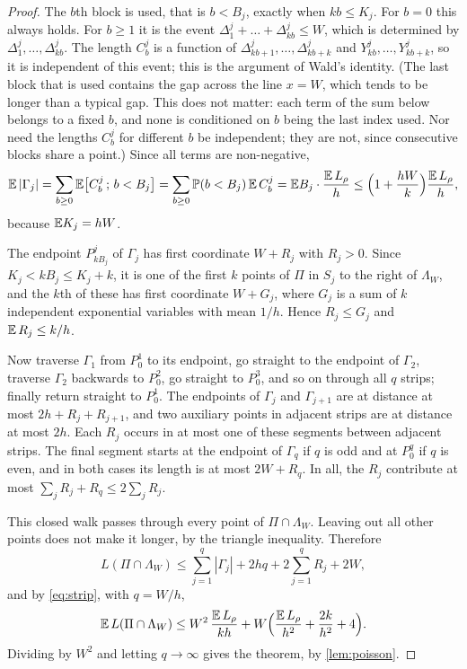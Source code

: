 \begin{proof}
The $b$th block is used, that is $b<B_j$, exactly when $kb\le K_j$. For $b=0$ this always holds. For $b\ge1$ it is the event $\Delta^j_1+\dots+\Delta^j_{kb}\le W$, which is determined by $\Delta^j_1,\dots,\Delta^j_{kb}$. The length $C^j_b$ is a function of $\Delta^j_{kb+1},\dots,\Delta^j_{kb+k}$ and $Y^j_{kb},\dots,Y^j_{kb+k}$, so it is independent of this event; this is the argument of Wald's identity. (The last block that is used contains the gap across the line $x=W$, which tends to be longer than a typical gap. This does not matter: each term of the sum below belongs to a fixed $b$, and none is conditioned on $b$ being the last index used. Nor need the lengths $C^j_b$ for different $b$ be independent; they are not, since consecutive blocks share a point.) Since all terms are non-negative,
\begin{equation}\label{eq:strip}
\mathbb{E}\,|\Gamma_j|=\sum_{b\ge0}\mathbb{E}\bigl[C^j_b\,;\,b<B_j\bigr]=\sum_{b\ge0}\mathbb{P}(b<B_j)\,\mathbb{E}\,C^j_b=\mathbb{E} B_j\cdot\frac{\mathbb{E}\,L_\rho}{h}\le\Bigl(1+\frac{hW}{k}\Bigr)\frac{\mathbb{E}\,L_\rho}{h},
\end{equation}
because $\mathbb{E} K_j=hW$.

The endpoint $P^j_{kB_j}$ of $\Gamma_j$ has first coordinate $W+R_j$ with $R_j>0$. Since $K_j<kB_j\le K_j+k$, it is one of the first $k$ points of $\Pi$ in $S_j$ to the right of $\Lambda_W$, and the $k$th of these has first coordinate $W+G_j$, where $G_j$ is a sum of $k$ independent exponential variables with mean $1/h$. Hence $R_j\le G_j$ and $\mathbb{E}\,R_j\le k/h$.

Now traverse $\Gamma_1$ from $P^1_0$ to its endpoint, go straight to the endpoint of $\Gamma_2$, traverse $\Gamma_2$ backwards to $P^2_0$, go straight to $P^3_0$, and so on through all $q$ strips; finally return straight to $P^1_0$. The endpoints of $\Gamma_j$ and $\Gamma_{j+1}$ are at distance at most $2h+R_j+R_{j+1}$, and two auxiliary points in adjacent strips are at distance at most $2h$. Each $R_j$ occurs in at most one of these segments between adjacent strips. The final segment starts at the endpoint of $\Gamma_q$ if $q$ is odd and at $P^q_0$ if $q$ is even, and in both cases its length is at most $2W+R_q$. In all, the $R_j$ contribute at most $\sum_jR_j+R_q\le2\sum_jR_j$.

This closed walk passes through every point of $\Pi\cap \Lambda_W$. Leaving out all other points does not make it longer, by the triangle inequality. Therefore
\[
L(\Pi\cap \Lambda_W)\le\sum_{j=1}^q|\Gamma_j|+2hq+2\sum_{j=1}^qR_j+2W,
\]
and by \eqref{eq:strip}, with $q=W/h$,
\[
\mathbb{E}\,L(\Pi\cap \Lambda_W)\le W^2\,\frac{\mathbb{E}\,L_\rho}{kh}+W\Bigl(\frac{\mathbb{E}\,L_\rho}{h^2}+\frac{2k}{h^2}+4\Bigr).
\]
Dividing by $W^2$ and letting $q\to\infty$ gives the theorem, by \cref{lem:poisson}.
\end{proof}
